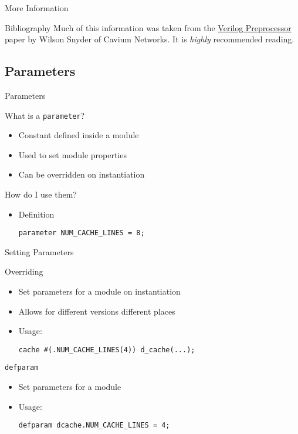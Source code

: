 \documentclass[dvipsnames]{beamer}
\begin{document}
\begin{frame}{More Information}
	\begin{block}{Bibliography}
		Much of this information was taken from the 
		\href{http://www.veripool.org/papers/Preproc_Good_Evil_SNUGBos10_paper.pdf}{Verilog Preprocessor}
		paper by Wilson Snyder of Cavium Networks. It is \emph{highly}
		recommended reading.
	\end{block}
\end{frame}

\subsection{Parameters}
\begin{frame}[fragile]{Parameters}
	\begin{block}{What is a \texttt{parameter}?}
		\begin{itemize}
			\item Constant defined inside a module
			\item Used to set module properties
			\item Can be overridden on instantiation
		\end{itemize}
	\end{block}
	\begin{block}{How do I use them?}
		\begin{itemize}
			\item Definition
				\begin{verbatim}
parameter NUM_CACHE_LINES = 8;
				\end{verbatim}
		\end{itemize}
	\end{block}
\end{frame}

\begin{frame}[fragile]{Setting Parameters}
	\begin{block}{Overriding}
		\begin{itemize}
			\item Set parameters for a module on instantiation
			\item Allows for different versions different places
			\item Usage:
				\begin{verbatim}
cache #(.NUM_CACHE_LINES(4)) d_cache(...);
				\end{verbatim}
		\end{itemize}
	\end{block}
	\begin{block}{\texttt{defparam}}
		\begin{itemize}
			\item Set parameters for a module 
			\item Usage: 
				\begin{verbatim}
defparam dcache.NUM_CACHE_LINES = 4;
				\end{verbatim}
		\end{itemize}
	\end{block}
\end{frame}
\end{document}

